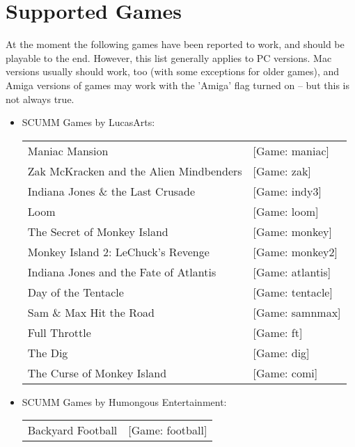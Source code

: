 


\section{Supported Games}

At the moment the following games have been reported to work, and should
be playable to the end. However, this list generally applies to PC versions.
Mac versions usually should work, too (with some exceptions for older games),
and Amiga versions of games may work with the 'Amiga' flag turned on -- but
this is not always true.

\begin{itemize}
\item SCUMM Games by LucasArts:\\
  \begin {tabular} [h] {ll}
    Maniac Mansion&                                [Game: maniac]\\
    Zak McKracken and the Alien Mindbenders&       [Game: zak]\\
    Indiana Jones \& the Last Crusade&             [Game: indy3]\\
    Loom&                                          [Game: loom]\\
    The Secret of Monkey Island&                   [Game: monkey]\\
    Monkey Island 2: LeChuck's Revenge&            [Game: monkey2]\\
    Indiana Jones and the Fate of Atlantis&        [Game: atlantis]\\
    Day of the Tentacle&                           [Game: tentacle]\\
    Sam \& Max Hit the Road&                       [Game: samnmax]\\
    Full Throttle&                                 [Game: ft]\\
    The Dig&                                       [Game: dig]\\
    The Curse of Monkey Island&                    [Game: comi]\\
  \end{tabular}
\item SCUMM Games by Humongous Entertainment:\\
  \begin{tabular}[h]{ll}
    Backyard Football&                                             [Game: football]\\

\end{tabular}
\end{itemize}
